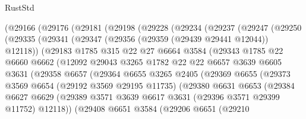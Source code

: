 \begin{lexlean}{RustStd}
\begin{coremodule}
    (@29166
      (@29176
        (@29181
          (@29198
            (@29228
              (@29234
                (@29237
                  (@29247
                    (@29250
                      (@29335
                        (@29341
                          (@29347 (@29356 (@29359 (@29439 @29441 @12044)) @12118))
                          (@29183
                            @1785
                            @315
                            @22
                            @27
                            @6664
                            @3584
                            (@29343
                              @1785
                              @22
                              @6660
                              @6662
                              (@12092
                                @29043
                                @3265
                                @1782
                                @22
                                @22
                                @6657
                                @3639
                                @6605
                                @3631
                                (@29358
                                  @6657
                                  (@29364
                                    @6655
                                    @3265
                                    @2405
                                    (@29369
                                      @6655
                                      (@29373
                                        @3569
                                        @6654
                                        (@29192 @3569 @29195 @11735)
                                        (@29380
                                          @6631
                                          @6653
                                          (@29384
                                            @6627
                                            @6629
                                            (@29389
                                              @3571
                                              @3639
                                              @6617
                                              @3631
                                              (@29396 @3571 @29399 @11752)
                                              @12118))
                                          (@29408
                                            @6651
                                            @3584
                                            (@29206
                                              @6651
                                              (@29210

\end{coremodule}
\end{lexlean}
